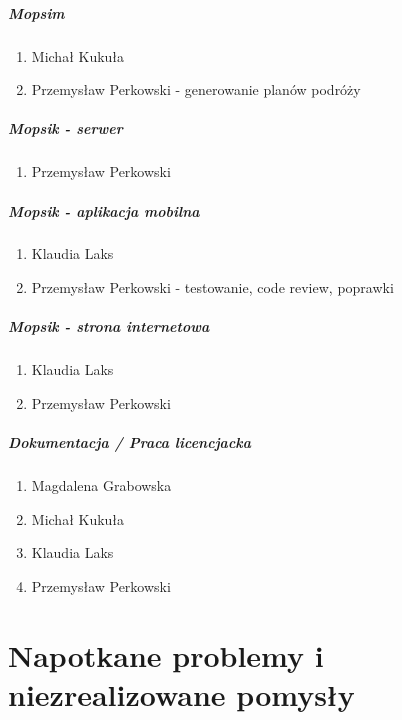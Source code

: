 \paragraph{Mopsim}
\begin{enumerate}
\item Michał Kukuła
\item Przemysław Perkowski - generowanie planów podróży
\end{enumerate}

\paragraph{Mopsik - serwer}
\begin{enumerate}
\item Przemysław Perkowski
\end{enumerate}

\paragraph{Mopsik - aplikacja mobilna}
\begin{enumerate}
\item Klaudia Laks
\item Przemysław Perkowski - testowanie, code review, poprawki
\end{enumerate}

\paragraph{Mopsik - strona internetowa}
\begin{enumerate}
\item Klaudia Laks
\item Przemysław Perkowski
\end{enumerate}

\paragraph{Dokumentacja / Praca licencjacka}
\begin{enumerate}
\item Magdalena Grabowska
\item Michał Kukuła
\item Klaudia Laks
\item Przemysław Perkowski
\end{enumerate}

\chapter{Napotkane problemy i niezrealizowane pomysły}

